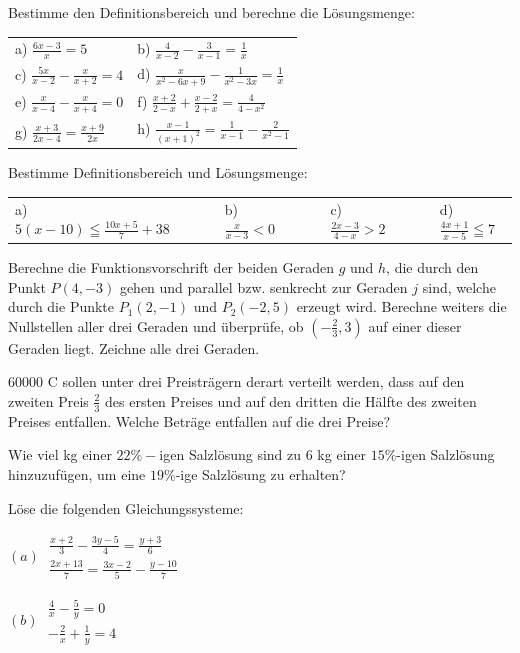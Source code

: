 \documentclass[a4paper, twoside, parskip, 10pt, smallheadings]{scrbook}
\newcommand\euro{{\sffamily C%
    \makebox[0pt][l]{\kern-.70em\mbox{--}}%
    \makebox[0pt][l]{\kern-.68em\raisebox{.25ex}{--}}}}
\theoremstyle{plain}
\theoremstyle{definition}
\newcommand{\bt}{\begin{tabular}}
\newcommand{\et}{\end{tabular}}
\newcommand{\D}{\displaystyle}
\renewcommand{\leq}{\leqq}
\begin{document}
\item Bestimme den Definitionsbereich und berechne die
Lösungsmenge:

\bt{ll}  a) $\D{\frac{6x-3}{x}=5}$ &
         b) $\D{\frac{4}{x-2}-\frac{3}{x-1}=\frac{1}{x}}$ \\[0.2cm]
         c) $\D{\frac{5x}{x-2}-\frac{x}{x+2}=4}$ &
         d) $\D{\frac{x}{x^2-6x+9}-\frac{1}{x^2-3x}=\frac{1}{x}}$ \\[0.2cm]
         e) $\D{\frac{x}{x-4}-\frac{x}{x+4}=0}$ &
         f) $\D{\frac{x+2}{2-x}+\frac{x-2}{2+x}=\frac{4}{4-x^2}}$ \\[0.2cm]
         g) $\D{\frac{x+3}{2x-4}=\frac{x+9}{2x}}$ &
         h) $\D{\frac{x-1}{(x+1)^2}=\frac{1}{x-1}-\frac{2}{x^2-1}}$  \et

\item Bestimme Definitionsbereich und Lösungsmenge:

\bt{llll} a) $5(x-10)\leq \frac{10x+5}{7}+38 \qquad$ &
          b) $\frac{x}{x-3}<0 \qquad$ &
          c) $\frac{2x-3}{4-x}>2 \qquad$ &
          d)$\frac{4x+1}{x-5}\leq 7 $
\et

\item Berechne die Funktionsvorschrift der beiden Geraden $g$ und
$h$, die durch den Punkt $P(4,-3)$ gehen und parallel bzw.
senkrecht zur Geraden $j$ sind, welche durch die Punkte $P_1
(2,-1)$ und $P_2 (-2,5)$ erzeugt wird. Berechne weiters die
Nullstellen aller drei Geraden und überprüfe, ob
$(-\frac{2}{3},3)$ auf einer dieser Geraden liegt. Zeichne alle
drei Geraden.

\item 60000 \euro \quad sollen unter drei Preisträgern derart verteilt
werden, dass auf den zweiten Preis $\frac{2}{3}$ des ersten
Preises und auf den dritten die Hälfte des zweiten Preises
entfallen. Welche Beträge entfallen auf die drei Preise?

\item Wie viel kg einer $22\%-$igen Salzlösung sind zu 6 kg einer
$15\%$-igen Salzlösung hinzuzufügen, um eine $19\%$-ige Salzlösung
zu erhalten?

\item Löse die folgenden Gleichungssysteme:

$(a)\;%
\begin{array}{c}
\frac{x+2}{3}-\frac{3y-5}{4}=\frac{y+3}{6} \\
\frac{2x+13}{7}=\frac{3x-2}{5}-\frac{y-10}{7}%
\end{array}
$ 

$ (b)\;%
\begin{array}{c}
\frac{4}{x}-\frac{5}{y}=0 \\
-\frac{2}{x}+\frac{1}{y}=4%
\end{array}
$
\end{document}
